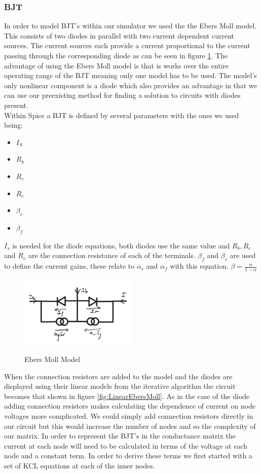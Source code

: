 \documentclass{article}
\begin{document}
\subsubsection{BJT}
In order to model BJT's within our simulator we used the the Ebers Moll model. This consists of two diodes in parallel with two current dependent current sources. The current sources each provide a current proportional to the current passing through the corresponding diode as can be seen in figure \ref{fig:EbersMoll}. The advantage of using the Ebers Moll model is that is works over the entire operating range of the BJT meaning only one model has to be used. The model's only nonlinear component is a diode which also provides an advantage in that we can use our preexisting method for finding a solution to circuits with diodes present. \\
Within Spice a BJT is defined by several parameters with the ones we used being: 
\begin{itemize}
    \item $I_S$
    \item $R_b$
    \item $R_c$
    \item $R_e$
    \item $\beta_r$
    \item $\beta_f$
\end{itemize}
$I_s$ is needed for the diode equations, both diodes use the same value and $R_b, R_c$ and $R_e$ are the connection resistance of each of the terminals. $\beta_f$ and $\beta_r$ are used to define the current gains, these relate to $\alpha_r$ and $\alpha_f$ with this equation. \bigbreak
$\beta = \frac{\alpha}{1-\alpha}$\bigbreak
\begin{figure}[h]
    \caption{Ebers Moll Model}
    \centering
    \includegraphics[width=0.5\textwidth]{images/EbersMoll.png}
    \label{fig:EbersMoll}
\end{figure}
When the connection resistors are added to the model and the diodes are displayed using their linear models from the iterative algorithm the circuit becomes that shown in figure \ref{fig:LinearEbersMoll}. As in the case of the diode adding connection resistors makes calculating the dependence of current on node voltages more complicated. We could simply add connection resistors directly in our circuit but this would increase the number of nodes and so the complexity of our matrix. In order to represent the BJT's in the conductance matrix the current at each node will need to be calculated in terms of the voltage at each node and a constant term. In order to derive these terms we first started with a set of KCL equations at each of the inner nodes. \bigbreak
\end{document}
